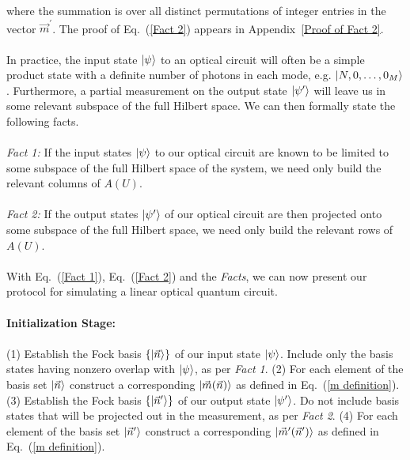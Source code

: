 \documentclass[aps,pra,twocolumn,showpacs,superscriptaddress,floatfix,10pt]{revtex4}
\begin{document}
where the summation is over all distinct permutations of integer entries in the vector $\vec{m}^\prime$. The proof of Eq.~(\ref{Fact 2}) appears in Appendix~\ref{Proof of Fact 2}.
\\
\\
\indent In practice, the input state $\ket{\psi}$ to an optical circuit  will often be a simple product state with a definite number of photons in each mode, e.g. $\ket{N,0,\dots,0_M}$. Furthermore, a partial measurement on the output state $\ket{\psi^\prime}$ will leave us in some relevant subspace of the full Hilbert space. We can then formally state the following facts.
\\
\\
\textit{Fact 1:} If the input states $\ket{\psi}$ to our optical circuit are known to be limited to some subspace of the full Hilbert space of the system, we need only build the relevant columns of $A(U)$.
\\
\\
\textit{Fact 2:} If the output states $\ket{\psi^\prime}$ of our optical circuit  are then projected onto some subspace of the full Hilbert space, we need only build the relevant rows of $A(U)$.
\\
\\ \indent
With Eq.~(\ref{Fact 1}), Eq.~(\ref{Fact 2}) and the \textit{Facts}, we can now present our protocol for simulating a linear optical quantum circuit.
\\
\\
\textbf{Initialization Stage:}
\\
\\ 
		(1)  Establish the Fock basis $\{\ket{\vec{n}} \}$ of our input state $\ket{\psi}$.  Include only the basis states having nonzero overlap with $\ket{\psi}$, as per \textit{Fact 1}.
		\newline
		\newline
		(2) For each element of the basis set $\ket{\vec{n}}$ construct a corresponding $\ket{\vec{m}(\vec{n})}$ as defined in Eq.~(\ref{m definition}).
		\newline
		\newline
		(3) Establish the Fock basis $\{\ket{\vec{n}^\prime}\}$ of our output state $\ket{\psi^\prime}$. Do not include basis states that will be projected out in the measurement, as per \textit{Fact 2}.
		\newline
		\newline
		(4)  For each element of the basis set $\ket{\vec{n}^\prime}$ construct a corresponding $\ket{\vec{m}^\prime(\vec{n}^\prime)}$ as defined in Eq.~(\ref{m definition}).
\end{document}
